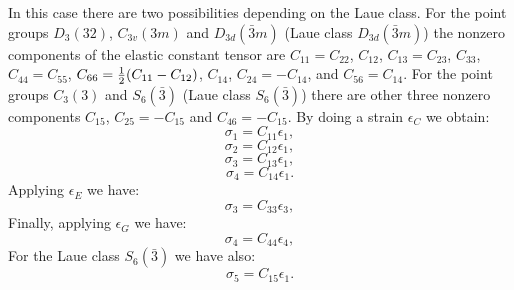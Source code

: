 \documentclass[12pt,a4paper,twoside]{report}
\begin{document}
In this case there are two possibilities depending on the Laue class. For
the point groups $D_3(32)$, $C_{3v}(3m)$ and $D_{3d}(\bar 3m)$ (Laue class
$D_{3d}(\bar 3m)$) the nonzero components of the elastic constant tensor
are $C_{11}=C_{22}$, $C_{12}$, $C_{13}=C_{23}$, $C_{33}$, $C_{44}=C_{55}$, 
$C_{66}={1\over 2} (C_{11}-C_{12})$, $C_{14}$, $C_{24}=-C_{14}$, and 
$C_{56}=C_{14}$. For the point groups $C_3(3)$ and $S_6(\bar 3)$ (Laue
class $S_6(\bar 3)$) there are other three nonzero components $C_{15}$, 
$C_{25}=-C_{15}$ and $C_{46}=-C_{15}$. 
By doing a strain $\epsilon_C$ we obtain:
\begin{equation}
\sigma_1=C_{11} \epsilon_1,
\end{equation}
\begin{equation}
\sigma_2=C_{12} \epsilon_1,
\end{equation}
\begin{equation}
\sigma_3=C_{13} \epsilon_1,
\end{equation}
\begin{equation}
\sigma_4=C_{14} \epsilon_1.
\end{equation}
Applying $\epsilon_E$ we have:
\begin{equation}
\sigma_3=C_{33} \epsilon_3,
\end{equation}
Finally, applying $\epsilon_G$ we have:
\begin{equation}
\sigma_4=C_{44} \epsilon_4,
\end{equation}
For the Laue class $S_6(\bar 3)$ we have also:
\begin{equation}
\sigma_5=C_{15} \epsilon_1.
\end{equation}
\end{document}
